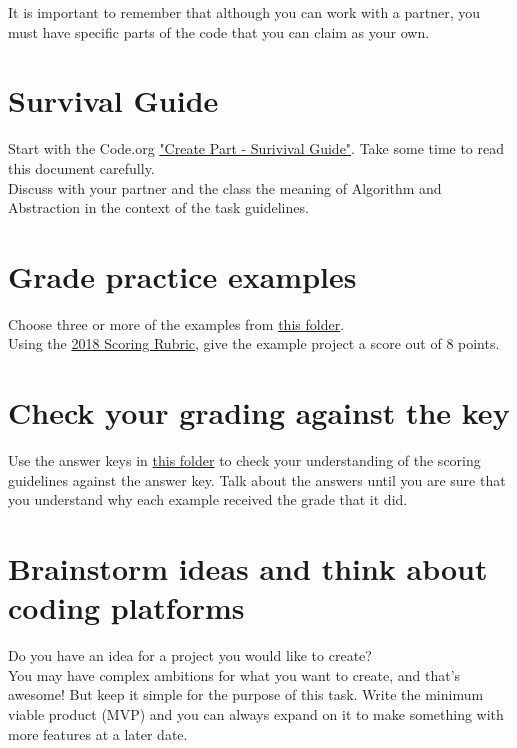 \documentclass{42-en}
\begin{document}
It is important to remember that although you can work with a partner, you must have specific parts of the code that you can claim as your own.

\section{Survival Guide}

Start with the Code.org \href{https://drive.google.com/open?id=1-U99DQmmtXMP89qT9NkTVA8szV2nWn_Y}{"Create Part - Surivival Guide"}. Take some time to read this document carefully.\\

Discuss with your partner and the class the meaning of Algorithm and Abstraction in the context of the task guidelines. 

\section{Grade practice examples}

Choose three or more of the examples from \href{https://drive.google.com/drive/folders/11iHSUH9LRAdehW57zJhNGrhJXZaDu2ji?usp=sharing}{this folder}.\\

Using the \href{https://drive.google.com/file/d/0B8tSiu_FFz0IVTNzOFhlMGdOQnM/view?usp=sharing}{2018 Scoring Rubric}, give the example project a score out of 8 points.\\

\section{Check your grading against the key}

Use the answer keys in \href{https://drive.google.com/drive/folders/1Bucwdax7POi-oylK6FhLSF2YxpW8ylQd?usp=sharing}{this folder} to check your understanding of the scoring guidelines against the answer key. Talk about the answers until you are sure that you understand why each example received the grade that it did.

\section{Brainstorm ideas and think about coding platforms}

Do you have an idea for a project you would like to create?\\

You may have complex ambitions for what you want to create, and that's awesome! But keep it simple for the purpose of this task. Write the minimum viable product (MVP) and you can always expand on it to make something with more features at a later date.\\
\end{document}
